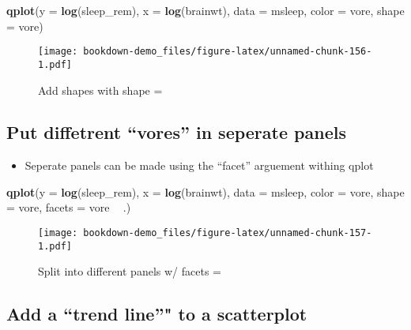 \documentclass[]{book}
\newenvironment{Shaded}{\begin{snugshade}}{\end{snugshade}}
\newcommand{\KeywordTok}[1]{\textcolor[rgb]{0.13,0.29,0.53}{\textbf{#1}}}
\newcommand{\DataTypeTok}[1]{\textcolor[rgb]{0.13,0.29,0.53}{#1}}
\newcommand{\StringTok}[1]{\textcolor[rgb]{0.31,0.60,0.02}{#1}}
\newcommand{\OperatorTok}[1]{\textcolor[rgb]{0.81,0.36,0.00}{\textbf{#1}}}
\newcommand{\NormalTok}[1]{#1}
\providecommand{\tightlist}{%
  \setlength{\itemsep}{0pt}\setlength{\parskip}{0pt}}
\theoremstyle{definition}
\theoremstyle{definition}
\theoremstyle{definition}
\theoremstyle{remark}
\begin{document}
\begin{Shaded}
\begin{Highlighting}[]
\KeywordTok{qplot}\NormalTok{(}\DataTypeTok{y =} \KeywordTok{log}\NormalTok{(sleep_rem),}
      \DataTypeTok{x =} \KeywordTok{log}\NormalTok{(brainwt), }
      \DataTypeTok{data =}\NormalTok{ msleep,}
      \DataTypeTok{color =}\NormalTok{ vore,}
      \DataTypeTok{shape =}\NormalTok{ vore)}
\end{Highlighting}
\end{Shaded}

\begin{figure}
\centering
\texttt{[image: bookdown-demo\_files/figure-latex/unnamed-chunk-156-1.pdf]}
\caption{\label{fig:unnamed-chunk-156}Add shapes with shape =}
\end{figure}

\subsection{\texorpdfstring{Put diffetrent ``vores'' in seperate
panels}{Put diffetrent vores in seperate panels}}\label{put-diffetrent-vores-in-seperate-panels}

\begin{itemize}
\tightlist
\item
  Seperate panels can be made using the ``facet'' arguement withing
  qplot
\end{itemize}

\begin{Shaded}
\begin{Highlighting}[]
\KeywordTok{qplot}\NormalTok{(}\DataTypeTok{y =} \KeywordTok{log}\NormalTok{(sleep_rem),}
      \DataTypeTok{x =} \KeywordTok{log}\NormalTok{(brainwt), }
      \DataTypeTok{data =}\NormalTok{ msleep,}
      \DataTypeTok{color =}\NormalTok{ vore,}
      \DataTypeTok{shape =}\NormalTok{ vore,}
      \DataTypeTok{facets =}\NormalTok{ vore }\OperatorTok{~}\StringTok{ }\NormalTok{.)}
\end{Highlighting}
\end{Shaded}

\begin{figure}
\centering
\texttt{[image: bookdown-demo\_files/figure-latex/unnamed-chunk-157-1.pdf]}
\caption{\label{fig:unnamed-chunk-157}Split into different panels w/ facets
=}
\end{figure}

\subsection{\texorpdfstring{Add a ``trend line''" to a
scatterplot}{Add a trend line" to a scatterplot}}\label{add-a-trend-line-to-a-scatterplot}
\end{document}
